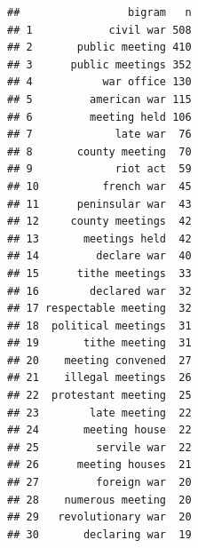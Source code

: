 \documentclass[
]{article}
\newenvironment{Shaded}{\begin{snugshade}}{\end{snugshade}}
\newcommand{\AttributeTok}[1]{\textcolor[rgb]{0.13,0.29,0.53}{#1}}
\newcommand{\ConstantTok}[1]{\textcolor[rgb]{0.56,0.35,0.01}{#1}}
\newcommand{\DecValTok}[1]{\textcolor[rgb]{0.00,0.00,0.81}{#1}}
\newcommand{\FunctionTok}[1]{\textcolor[rgb]{0.13,0.29,0.53}{\textbf{#1}}}
\newcommand{\NormalTok}[1]{#1}
\newcommand{\OtherTok}[1]{\textcolor[rgb]{0.56,0.35,0.01}{#1}}
\newcommand{\SpecialCharTok}[1]{\textcolor[rgb]{0.81,0.36,0.00}{\textbf{#1}}}
\newcommand{\StringTok}[1]{\textcolor[rgb]{0.31,0.60,0.02}{#1}}
\begin{document}
\begin{Shaded}
\end{Shaded}

\begin{verbatim}
##                 bigram   n
## 1            civil war 508
## 2       public meeting 410
## 3      public meetings 352
## 4           war office 130
## 5         american war 115
## 6         meeting held 106
## 7             late war  76
## 8       county meeting  70
## 9             riot act  59
## 10          french war  45
## 11      peninsular war  43
## 12     county meetings  42
## 13       meetings held  42
## 14         declare war  40
## 15      tithe meetings  33
## 16        declared war  32
## 17 respectable meeting  32
## 18  political meetings  31
## 19       tithe meeting  31
## 20    meeting convened  27
## 21    illegal meetings  26
## 22  protestant meeting  25
## 23        late meeting  22
## 24       meeting house  22
## 25         servile war  22
## 26      meeting houses  21
## 27         foreign war  20
## 28    numerous meeting  20
## 29   revolutionary war  20
## 30       declaring war  19
\end{verbatim}
\end{document}
